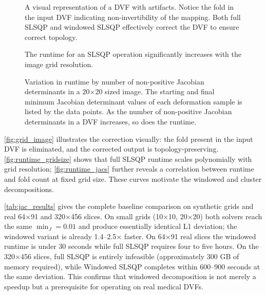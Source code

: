 \documentclass[lettersize,journal]{IEEEtran}
\begin{document}
\begin{figure}
    \centering
    \caption{A visual representation of a DVF with artifacts. Notice the fold in the input DVF indicating non-invertibility of the mapping. Both full SLSQP and windowed SLSQP effectively correct the DVF to ensure correct topology.}
    \label{fig:grid_image}
\end{figure}

\begin{figure}
    \centering
    \caption{The runtime for an SLSQP operation significantly increases with the image grid resolution.}
    \label{fig:runtime_gridsize}
\end{figure}

\begin{figure}
    \centering
    \caption{Variation in runtime by number of non-positive Jacobian determinants in a 20$\times$20 sized image. The starting and final minimum Jacobian determinant values of each deformation sample is listed by the data points. As the number of non-positive Jacobian determinants in a DVF increases, so does the runtime.}
    \label{fig:runtime_jacs}
\end{figure}

\autoref{fig:grid_image} illustrates the correction visually: the fold present in the input DVF is eliminated, and the corrected output is topology-preserving. \autoref{fig:runtime_gridsize} shows that full SLSQP runtime scales polynomially with grid resolution; \autoref{fig:runtime_jacs} further reveals a correlation between runtime and fold count at fixed grid size. These curves motivate the windowed and cluster decompositions.

\autoref{tab:jac_results} gives the complete baseline comparison on synthetic grids and real 64$\times$91 and 320$\times$456 slices. On small grids (10$\times$10, 20$\times$20) both solvers reach the same $\min_J = 0.01$ and produce essentially identical L1 deviation; the windowed variant is already 1.4--2.5$\times$ faster. On 64$\times$91 real slices the windowed runtime is under 30 seconds while full SLSQP requires four to five hours. On the 320$\times$456 slices, full SLSQP is entirely infeasible (approximately 300 GB of memory required), while Windowed SLSQP completes within 600--900 seconds at the same deviation. This confirms that windowed decomposition is not merely a speedup but a prerequisite for operating on real medical DVFs.
\end{document}

